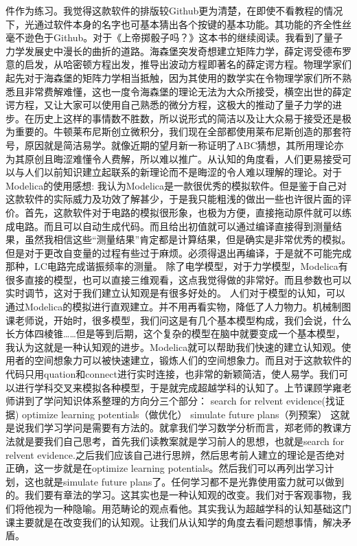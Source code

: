 \documentclass[11pt,fleqn]{book}
\numberwithin{dummy}{section}
\theoremstyle{ocrenumbox}
\theoremstyle{blacknumex}
\theoremstyle{blacknumbox}
\theoremstyle{ocrenum}
\newenvironment{remark}[1]{\par\vspace{10pt}\small %
	\begin{list}{}{
			\leftmargin=35pt %
			\rightmargin=25pt}\item\ignorespaces %
		\makebox[-2.5pt]{\begin{tikzpicture}[overlay]
			\node[draw=ocre!60,line width=1pt,circle,fill=ocre!25,font=\sffamily\bfseries,inner sep=2pt,outer sep=0pt] at (-15pt,0pt){\textcolor{ocre}{#1}};\end{tikzpicture}} %
		\advance\baselineskip -1pt}{\end{list}\vskip5pt} %
\newlength\esp
\begin{document}
\begin{remark}{刘}
件作为练习。我觉得这款软件的排版较Github更为清楚，在即使不看教程的情况下，光通过软件本身的名字也可基本猜出各个按键的基本功能。其功能的齐全性丝毫不逊色于Github。对于《上帝掷骰子吗？》这本书的继续阅读。我看到了量子力学发展史中漫长的曲折的道路。海森堡突发奇想建立矩阵力学，薛定谔受德布罗意的启发，从哈密顿方程出发，推导出波动方程即著名的薛定谔方程。物理学家们起先对于海森堡的矩阵力学相当抵触，因为其使用的数学实在令物理学家们所不熟悉且非常费解难懂，这也一度令海森堡的理论无法为大众所接受，横空出世的薛定谔方程，又让大家可以使用自己熟悉的微分方程，这极大的推动了量子力学的进步。在历史上这样的事情数不胜数，所以说形式的简洁以及让大众易于接受还是极为重要的。牛顿莱布尼斯创立微积分，我们现在全部都使用莱布尼斯创造的那套符号，原因就是简洁易学。就像近期的望月新一称证明了ABC猜想，其所用理论亦为其原创且晦涩难懂令人费解，所以难以推广。从认知的角度看，人们更易接受可以与人们以前知识建立起联系的新理论而不是晦涩的令人难以理解的理论。对于Modelica的使用感想:	我认为Modelica是一款很优秀的模拟软件。但是鉴于自己对这款软件的实际威力及功效了解甚少，于是我只能粗浅的做出一些也许很片面的评价。首先，这款软件对于电路的模拟很形象，也极为方便，直接拖动原件就可以练成电路。而且可以自动生成代码。而且给出初值就可以通过编译直接得到测量结果，虽然我相信这些“测量结果”肯定都是计算结果，但是确实是非常优秀的模拟。但是对于更改自变量的过程有些过于麻烦。必须得退出再编译，于是就不可能完成那种，LC电路完成谐振频率的测量。	除了电学模型，对于力学模型，Modelica有很多直接的模型，也可以直接三维观看，这点我觉得做的非常好。而且参数也可以实时调节，这对于我们建立认知观是有很多好处的。	人们对于模型的认知，可以通过Modelica的模拟进行直观建立。并不用再看实物，降低了人力物力。机械制图课老师说，开始时，很多模型，我们问这是有几个基本模型构成，我们会说，什么长方体四棱锥……但是等到后期，这个复杂的模型在脑中就要变成一个基本模型，我认为这就是一种认知观的进步。Modelica就可以帮助我们快速的建立认知观。使用者的空间想象力可以被快速建立，锻炼人们的空间想象力。而且对于这款软件的代码只用quation和connect进行实时连接，也非常的新颖简洁，使人易学。我们可以进行学科交叉来模拟各种模型，于是就完成超越学科的认知了。上节课顾学雍老师讲到了学问知识体系整理的方向分三个部分：	search for relvent evidence(找证据)  optimize learning potentials（做优化）	simulate future plans（列预案）	这就是说我们学习学问是需要有方法的。就拿我们学习数学分析而言，郑老师的教课方法就是要我们自己思考，首先我们读教案就是学习前人的思想，也就是search for relvent evidence.之后我们应该自己进行思辨，然后思考前人建立的理论是否绝对正确，这一步就是在optimize learning potentials。然后我们可以再列出学习计划，这也就是simulate future plans了。任何学习都不是光靠使用蛮力就可以做到的。我们要有章法的学习。这其实也是一种认知观的改变。我们对于客观事物，我们将他视为一种隐喻。用范畴论的观点看他。其实我认为超越学科的认知基础这门课主要就是在改变我们的认知观。让我们从认知学的角度去看问题想事情，解决矛盾。
\end{remark}
\end{document}
